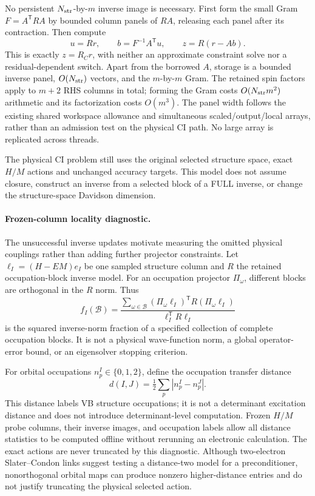 \documentclass[11pt,a4paper]{article}
\newcommand{\Tr}{^{\mathsf T}}
\begin{document}
No persistent $N_{\rm str}$-by-$m$ inverse image is necessary. First form
the small Gram $F=A\Tr RA$ by bounded column panels of $RA$, releasing
each panel after its contraction. Then compute
\begin{equation}
 u=Rr,\qquad b=F^{-1}A\Tr u,\qquad z=R(r-Ab).
 \label{eq:ci-streamed-restricted-inverse}
\end{equation}
This is exactly $z=R_Cr$, with neither an approximate constraint solve
nor a residual-dependent switch. Apart from the borrowed $A$, storage
is a bounded inverse panel, $O(N_{\rm str})$ vectors, and the
$m$-by-$m$ Gram. The retained spin factors apply to $m+2$ RHS columns
in total; forming the Gram costs $O(N_{\rm str}m^2)$ arithmetic and its
factorization costs $O(m^3)$. The panel width follows the existing shared
workspace allowance and simultaneous scaled/output/local arrays, rather
than an admission test on the physical CI path. No large array is
replicated across threads.

The physical CI problem still uses the original selected structure
space, exact $H/M$ actions and unchanged accuracy targets. This model
does not assume closure, construct an inverse from a selected block of
a FULL inverse, or change the structure-space Davidson dimension.

\paragraph{Frozen-column locality diagnostic.}
The unsuccessful inverse updates motivate measuring the omitted physical
couplings rather than adding further projector constraints. Let
$\ell_I=(H-EM)e_I$ be one sampled structure column and $R$ the retained
occupation-block inverse model. For an occupation projector $\Pi_\omega$,
different blocks are orthogonal in the $R$ norm. Thus
\begin{equation}
 f_I(\mathcal B)=
 \frac{\sum_{\omega\in\mathcal B}
       (\Pi_\omega\ell_I)\Tr R(\Pi_\omega\ell_I)}
      {\ell_I\Tr R\ell_I}
\end{equation}
is the squared inverse-norm fraction of a specified collection of complete
occupation blocks. It is not a physical wave-function norm, a global
operator-error bound, or an eigensolver stopping criterion.

For orbital occupations $n_p^I\in\{0,1,2\}$, define the occupation
transfer distance
\begin{equation}
 d(I,J)=\tfrac12\sum_p|n_p^I-n_p^J|.
\end{equation}
This distance labels VB structure occupations; it is not a determinant
excitation distance and does not introduce determinant-level computation.
Frozen $H/M$ probe columns, their inverse images, and occupation labels
allow all distance statistics to be computed offline without rerunning
an electronic calculation. The exact actions are never truncated by this
diagnostic. Although two-electron Slater--Condon links suggest testing a
distance-two model for a preconditioner, nonorthogonal orbital maps can
produce nonzero higher-distance entries and do not justify truncating the
physical selected action.
\end{document}

